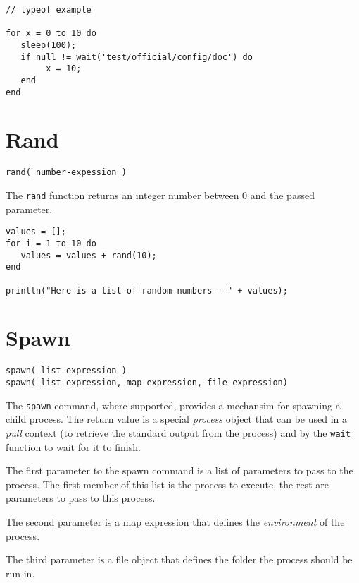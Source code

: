 \begin{lstlisting}[caption={Sleep example}]
// typeof example

for x = 0 to 10 do
   sleep(100);
   if null != wait('test/official/config/doc') do
        x = 10;
   end
end

\end{lstlisting}

\section{Rand}

\begin{Verbatim}
rand( number-expession )
\end{Verbatim}

The \Verb+rand+ function returns an integer number between 0 and the passed parameter.

\begin{lstlisting}[caption={Rand example}]
values = [];
for i = 1 to 10 do
   values = values + rand(10);
end

println("Here is a list of random numbers - " + values);

\end{lstlisting}

\section{Spawn}

\begin{Verbatim}
spawn( list-expression )
spawn( list-expression, map-expression, file-expression)
\end{Verbatim}

The \Verb+spawn+ command, where supported, provides a mechansim for spawning a child process. The return value is a special \emph{process} object that can be used in a \emph{pull} context (to retrieve the standard output from the process) and by the \verb+wait+ function to wait for it to finish.

The first parameter to the spawn command is a list of parameters to pass to the process. The first member of this list is the process to execute, the rest are parameters to pass to this process.

The second parameter is a map expression that defines the \emph{environment} of the process.

The third parameter is a file object that defines the folder the process should be run in.

